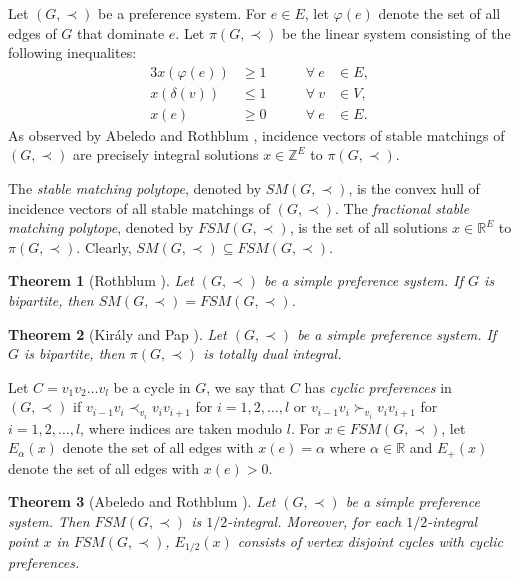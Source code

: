 \documentclass[11pt]{article}
\newtheorem{theorem}{Theorem}%
\numberwithin{theorem}{section}
\begin{document}
Let $(G,\prec)$ be a preference system. For $e\in E$, let $\varphi(e)$ denote the set of all edges of $G$ that dominate $e$. Let $\pi(G,\prec)$ be the linear system consisting of the following inequalites:
\begin{alignat}{3}
x(\varphi(e)) &\geq 1 &\qquad \forall ~e &\in E,\label{stability constraints}\\
x(\delta(v)) &\leq 1 &\qquad \forall ~v &\in V,\label{matching constraints}\\
x(e) &\geq 0 &\qquad \forall ~e &\in E.\label{edge nonnegativity}
\end{alignat}
As observed by Abeledo and Rothblum \cite{AbelRoth94}, incidence vectors of stable matchings of $(G,\prec)$ are precisely integral solutions $x\in \mathbb{Z}^E$ to $\pi(G,\prec)$.

The \textit{stable matching polytope}, denoted by $SM(G,\prec)$, is the convex hull of incidence vectors of all stable matchings of $(G,\prec)$. The \textit{fractional stable matching polytope}, denoted by $FSM(G,\prec)$, is the set of all solutions $x\in \mathbb{R}^E$ to $\pi(G,\prec)$. Clearly, $SM(G,\prec)\subseteq FSM(G,\prec)$. 

\begin{theorem}[Rothblum \cite{Roth92}]
\label{thm:Roth92}
Let $(G,\prec)$ be a simple preference system. If $G$ is bipartite, then
$SM(G,\prec)=FSM(G,\prec)$.
\end{theorem}

\begin{theorem}[Kir\'{a}ly and Pap \cite{KiraPap08}]
\label{thm:KiraPap08}
Let $(G,\prec)$ be a simple preference system. If $G$ is bipartite, then $\pi(G,\prec)$ is totally dual integral.
\end{theorem}

Let $C=v_1 v_2 \ldots v_l$ be a cycle in $G$, we say that $C$ has \textit{cyclic preferences} in $(G,\prec)$ if
$v_{i-1} v_i \prec_{v_i} v_i v_{i+1}$ for $i=1,2,\ldots,l$
or $v_{i-1} v_i\succ_{v_i} v_i v_{i+1}$ for $i=1,2,\ldots,l$,
where indices are taken modulo $l$.
For $x\in FSM(G,\prec)$, let $E_{\alpha}(x)$ denote the set of all edges with $x(e)=\alpha$ where $\alpha\in\mathbb{R}$ and $E_+(x)$ denote the set of all edges with $x(e)>0$.

\begin{theorem}[Abeledo and Rothblum \cite{AbelRoth94}]
\label{thm:AbelRoth94}
Let $(G,\prec)$ be a simple preference system. Then $FSM(G,\prec)$ is $1/2$-integral. Moreover, for each $1/2$-integral point $x$ in $FSM(G,\prec)$, $E_{1/2}(x)$ consists of vertex disjoint cycles with cyclic preferences.
\end{theorem} 
\end{document}

